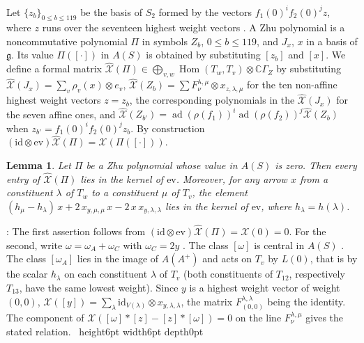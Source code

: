 \documentclass[leqno]{article}
\newcommand{\Cbb}{\ensuremath{\mathbb{C}}}
\renewcommand{\leq}{\ensuremath{\leqslant}}
\newcommand{\qed}{\hfill \vrule height6pt  width6pt depth0pt}
\newcommand{\ot}{\otimes}
\newtheorem{lemma}[thm]{Lemma}
\newenvironment{proof}[1][]{\noindent {\it Proof #1} : }{\hbox{~}\qed
\smallskip
}
\numberwithin{equation}{section}
\begin{document}
Let $\{z_b\}_{0 \leq b \leq 119}$ be the basis of $S_2$ formed by the vectors $f_1(0)^i f_2(0)^j z$, where $z$ runs over the seventeen highest weight vectors \cite[Proposition 11.3]{Arh26}. A Zhu polynomial is a noncommutative polynomial $\Pi$ in symbols $Z_b$, $0 \leq b \leq 119$, and $J_x$, $x$ in a basis of $\mathfrak g$. Its value $\Pi([\cdot])$ in $A(S)$ is obtained by substituting $[z_b]$ and $[x]$. We define a formal matrix $\widehat{\mathcal X}(\Pi) \in \bigoplus_{v,w} \operatorname{Hom}(T_w,T_v) \ot \Cbb\Gamma_Z$ by substituting $\widehat{\mathcal X}(J_x) = \sum_v \rho_v(x) \ot e_v$, $\widehat{\mathcal X}(Z_b) = \sum F^{\lambda,\mu}_\nu \ot x_{z,\lambda,\mu}$ for the ten non-affine highest weight vectors $z = z_b$, the corresponding polynomials in the $\widehat{\mathcal X}(J_x)$ for the seven affine ones, and $\widehat{\mathcal X}(Z_{b'}) = \operatorname{ad}(\rho(f_1))^i \operatorname{ad}(\rho(f_2))^j \widehat{\mathcal X}(Z_b)$ when $z_{b'} = f_1(0)^i f_2(0)^j z_b$. By construction $(\mathrm{id} \ot \mathrm{ev})\widehat{\mathcal X}(\Pi) = \mathcal X(\Pi([\cdot]))$.

\begin{lemma}
\label{zhu:lem:projected}
Let $\Pi$ be a Zhu polynomial whose value in $A(S)$ is zero. Then every entry of $\widehat{\mathcal X}(\Pi)$ lies in the kernel of $\mathrm{ev}$. Moreover, for any arrow $x$ from a constituent $\lambda$ of $T_w$ to a constituent $\mu$ of $T_v$, the element $(h_\mu - h_\lambda)\, x + 2\, x_{y,\mu,\mu}\, x - 2\, x\, x_{y,\lambda,\lambda}$ lies in the kernel of $\mathrm{ev}$, where $h_\lambda = h(\lambda)$.
\end{lemma}

\begin{proof}
The first assertion follows from $(\mathrm{id} \ot \mathrm{ev})\widehat{\mathcal X}(\Pi) = \mathcal X(0) = 0$. For the second, write $\omega = \omega_A + \omega_C$ with $\omega_C = 2y$ \cite[proof of Proposition 11.4]{Arh26}. The class $[\omega]$ is central in $A(S)$ \cite[Theorem 2.1.1 p.~247]{Zhu96}. The class $[\omega_A]$ lies in the image of $A(A^+)$ and acts on $T_v$ by $L(0)$, that is by the scalar $h_\lambda$ on each constituent $\lambda$ of $T_v$ (both constituents of $T_{12}$, respectively $T_{13}$, have the same lowest weight). Since $y$ is a highest weight vector of weight $(0,0)$, $\mathcal X([y]) = \sum_\lambda \mathrm{id}_{V(\lambda)} \ot x_{y,\lambda,\lambda}$, the matrix $F^{\lambda,\lambda}_{(0,0)}$ being the identity. The component of $\mathcal X([\omega] * [z] - [z] * [\omega]) = 0$ on the line $F^{\lambda,\mu}_\nu$ gives the stated relation.
\end{proof}
\end{document}

